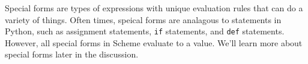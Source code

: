 Special forms are types of expressions with unique evaluation rules that can do a variety of things. Often times, speical forms are analagous to statements in Python, such as assignment statements, \texttt{if} statements, and \texttt{def} statements. However, all special forms in Scheme evaluate to a value. We'll learn more about special forms later in the discussion.
